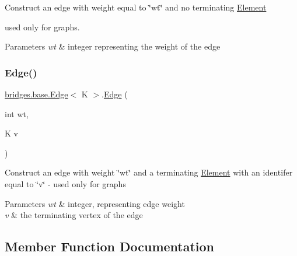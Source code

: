 Construct an edge with weight equal to \char`\"{}wt\char`\"{} and no terminating \hyperlink{classbridges_1_1base_1_1_element}{Element}
\begin{DoxyItemize}
\item used only for graphs. 
\begin{DoxyParams}{Parameters}
{\em wt} & integer representing the weight of the edge \\
\hline
\end{DoxyParams}

\end{DoxyItemize}\hypertarget{classbridges_1_1base_1_1_edge_afe54a7f07ad28ef551720f365e07b610}{}\label{classbridges_1_1base_1_1_edge_afe54a7f07ad28ef551720f365e07b610} 
\subsubsection{\texorpdfstring{Edge()}{Edge()}\hspace{0.1cm}{\footnotesize\ttfamily [3/3]}}
{\footnotesize\ttfamily \hyperlink{classbridges_1_1base_1_1_edge}{bridges.\+base.\+Edge}$<$ K $>$.\hyperlink{classbridges_1_1base_1_1_edge}{Edge} (\begin{DoxyParamCaption}\item[{int}]{wt,  }\item[{K}]{v }\end{DoxyParamCaption})}

Construct an edge with weight \char`\"{}wt\char`\"{} and a terminating \hyperlink{classbridges_1_1base_1_1_element}{Element} with an identifer equal to \char`\"{}v\char`\"{} -\/ used only for graphs


\begin{DoxyParams}{Parameters}
{\em wt} & integer, representing edge weight \\
\hline
{\em v} & the terminating vertex of the edge \\
\hline
\end{DoxyParams}


\subsection{Member Function Documentation}
\hypertarget{classbridges_1_1base_1_1_edge_a342c3a936fd39d8ea9b345707b4b2237}{}\label{classbridges_1_1base_1_1_edge_a342c3a936fd39d8ea9b345707b4b2237} 
